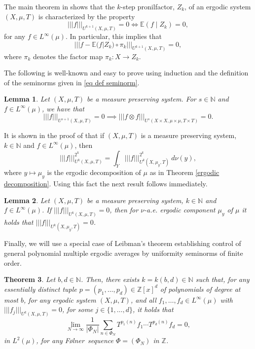 \documentclass[reqno]{amsart}
\def\Z{{\mathbb Z}}
\def\N{{\mathbb N}}
\newcommand{\nnorm}[1]{\lvert\!|\!| #1|\!|\!\rvert}
\newtheorem{theorem}{Theorem}[section]
\newtheorem{lemma}[theorem]{Lemma}
\theoremstyle{definition}
\theoremstyle{remark}
\def\N{{\mathbb N}}
\newcommand{\E}{\mathbb{E}}
\newcommand{\Folner}{F\o{}lner}
\begin{document}
The main theorem in \cite{Host_Kra_nonconventional_averages_nilmanifolds:2005} shows that the $k$-step pronilfactor, $Z_{k}$, of an ergodic system $(X, \mu,T)$ is characterized by the property 
    \begin{equation*} 
        \nnorm{f}_{U^{k+1}(X, \mu,T)} = 0 \iff \E(f \mid Z_{k}) =0,
    \end{equation*}
    for any $f\in L^{\infty}(\mu)$. In particular, this implies that 
    \begin{equation}\label{uniformity of orthocomplement}
    \nnorm{f-\mathbb{E}(f | Z_k)\circ \pi_k}_{U^{k+1}(X, \mu,T)} = 0,
    \end{equation}
    where $\pi_k$ denotes the factor map $\pi_k: X \to Z_k$.

The following is well-known and easy to prove using induction and the definition of the seminorms given in \eqref{eq def seminorm}.

\begin{lemma}\label{uniformity in tensor product}
Let $(X,\mu,T)$ be a measure preserving system. For $s\in \N$ and $f\in L^{\infty}(\mu)$, we have that 
$$ \nnorm{f}_{U^{s+1}(X,\mu,T)}=0 \implies \nnorm{f \otimes f}_{U^s(X\times X, \mu\times \mu, T\times T)}=0.$$
\end{lemma}

It is shown in the proof of \cite[Prop. 2.2]{Host_Kra09} that if 
$(X,\mu,T)$ is a measure preserving system, $k\in \N$ and 
$f\in L^{\infty}(\mu)$, then 
$$\nnorm{f}_{U^k(X,\mu,T)}^{2^k}=\int_Y \nnorm{f}_{U^k(X,\mu_y,T)}^{2^k}\ d\nu(y),$$ 
where $y\mapsto \mu_y$ is the ergodic decomposition of $\mu$ as in
Theorem \ref{ergodic decomposition}. Using this fact the next 
result follows immediately. 

\begin{lemma}\label{uniformity for ergodic components}
Let $(X,\mu,T)$ be a measure preserving system, $k\in \N$ and 
$f\in L^{\infty}(\mu)$. If 
$\nnorm{f}_{U^k(X,\mu,T)}=0$, then for $\nu$-a.e. ergodic component $\mu_y$ of $\mu$ it holds that $\nnorm{f}_{U^k(X,\mu_y,T)}=0$.      
\end{lemma}

Finally, we will use a special case of Leibman's theorem 
\cite[Theorem 3]{Leibman05} establishing 
control of general polynomial multiple ergodic averages by 
uniformity seminorms of finite order. 

\begin{theorem}\label{Leibman}
Let $b,d\in \N$. Then, there exists 
$k=k(b,d)\in \N$ such that, for any essentially distinct 
tuple $p=(p_1,\ldots,p_d)\in \Z[x]^d$ 
of polynomials of degree at most $b$, 
for any ergodic system $(X,\mu,T)$, and all 
$f_1,\ldots,f_d\in L^{\infty}(\mu)$ with 
$\nnorm{f_j}_{U^k(X,\mu,T)}=0$, for some $j\in \{1,\ldots,d\}$, it holds that 
$$\lim_{N\to \infty} \frac{1}{|\Phi_N|}\sum_{n\in \Phi_N} T^{p_1(n)}f_1 \cdots T^{p_d(n)}f_d=0,$$
in $L^2(\mu)$, for any \Folner\ sequence $\Phi=(\Phi_N)$ in $\Z$.
\end{theorem}
\end{document}

